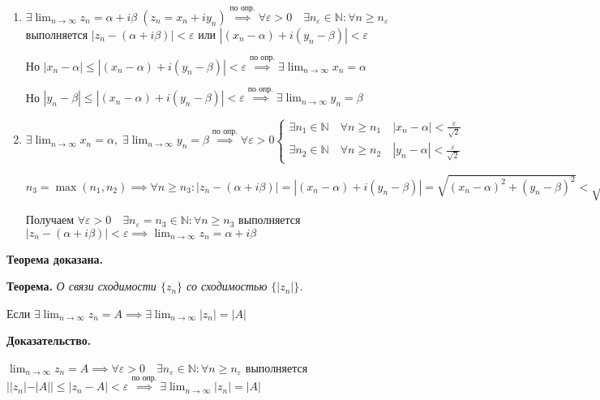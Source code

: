 \documentclass{article}
\newcommand{\bydef}{\stackrel{\text{по опр.}}{\implies}} %
\newcommand{\parspace}{\vspace{10pt}}
\newcommand{\dslim}{\displaystyle\lim}
\newcommand{\dslimn}{\dslim_{n \to \infty}}
\begin{document}
\begin{enumerate}
    \item %
    $\exists \dslimn z_n = \alpha + i \beta \; (z_n = x_n + i y_n)
    \bydef \forall \varepsilon > 0 \quad \exists n_\varepsilon \in \mathbb{N}:
    \forall n \ge n_\varepsilon$ выполняется $|z_n - (\alpha + i \beta)| < \varepsilon$
    или $|(x_n- \alpha) + i (y_n - \beta)| < \varepsilon$

    Но $|x_n - \alpha| \le |(x_n - \alpha) + i (y_n - \beta)| < \varepsilon
    \bydef \exists \dslimn x_n = \alpha$

    Но $|y_n - \beta| \le |(x_n - \alpha) + i (y_n - \beta)| < \varepsilon
    \bydef \exists \dslimn y_n = \beta$

    \item %
    $\exists \dslimn x_n = \alpha, \; \exists \dslimn y_n = \beta
    \bydef \forall \varepsilon > 0 \begin{cases}
        \exists n_1 \in \mathbb{N} \quad \forall n \ge n_1 \quad |x_n - \alpha| < \frac{\varepsilon}{\sqrt{2}} \\
        \exists n_2 \in \mathbb{N} \quad \forall n \ge n_2 \quad |y_n - \alpha| < \frac{\varepsilon}{\sqrt{2}}
    \end{cases}$
    
    $n_3 = \max (n_1, n_2) \implies \forall n \ge n_3:
    |z_n - (\alpha + i \beta)| = |(x_n - \alpha) + i (y_n - \beta)| =
    \sqrt{(x_n - \alpha)^2 + (y_n - \beta)^2} <
    \sqrt{\frac{\varepsilon^2}{2} + \frac{\varepsilon^2}{2}} = \varepsilon$

    Получаем $\forall \varepsilon > 0 \quad \exists n_\varepsilon = n_3 \in \mathbb{N}:
    \forall n \ge n_3$ выполняется $|z_n - (\alpha + i \beta)| < \varepsilon
    \implies \dslimn z_n = \alpha + i \beta$
\end{enumerate}

\textbf{Теорема доказана.}

\parspace

\textbf{Теорема.} \textit{О связи сходимости $\{z_n\}$ со сходимостью $\{|z_n|\}$.}

Если $\exists \dslimn z_n = A \implies \exists \dslimn |z_n| = |A|$

\textbf{Доказательство.}

$\dslimn z_n = A \implies \forall \varepsilon > 0 \quad \exists n_\varepsilon \in \mathbb{N}:
\forall n \ge n_\varepsilon$ выполняется $||z_n| - |A|| \le |z_n - A| < \varepsilon
\bydef \exists \dslimn |z_n| = |A|$
\end{document}
